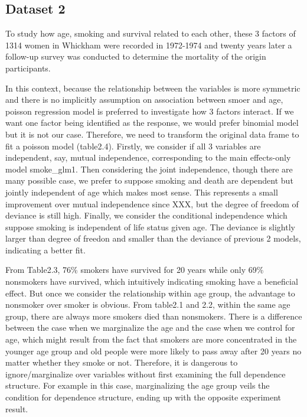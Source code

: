 \documentclass[]{article}
\begin{document}
\subsection{Dataset 2}\label{dataset-2}

To study how age, smoking and survival related to each other, these 3
factors of 1314 women in Whickham were recorded in 1972-1974 and twenty
years later a follow-up survey was conducted to determine the mortality
of the origin participants.

In this context, because the relationship between the variables is more
symmetric and there is no implicitly assumption on association between
smoer and age, poisson regression model is preferred to investigate how
3 factors interact. If we want one factor being identified as the
response, we would prefer binomial model but it is not our case.
Therefore, we need to transform the original data frame to fit a poisson
model (table2.4). Firstly, we consider if all 3 variables are
independent, say, mutual independence, corresponding to the main
effects-only model smoke\_glm1. Then considering the joint independence,
though there are many possible case, we prefer to suppose smoking and
death are dependent but jointly independent of age which makes most
sense. This represents a small improvement over mutual independence
since XXX, but the degree of freedom of deviance is still high. Finally,
we consider the conditional independence which suppose smoking is
independent of life status given age. The deviance is slightly larger
than degree of freedon and smaller than the deviance of previous 2
models, indicating a better fit.

From Table2.3, 76\% smokers have survived for 20 years while only 69\%
nonsmokers have survived, which intuitively indicating smoking have a
beneficial effect. But once we consider the relationship within age
group, the advantage to nonsmoker over smoker is obvious. From table2.1
and 2.2, within the same age group, there are always more smokers died
than nonsmokers. There is a difference between the case when we
marginalize the age and the case when we control for age, which might
result from the fact that smokers are more concentrated in the younger
age group and old people were more likely to pass away after 20 years no
matter whether they smoke or not. Therefore, it is dangerous to
ignore/marginalize over variables without first examining the full
dependence structure. For example in this case, marginalizing the age
group veils the condition for dependence structure, ending up with the
opposite experiment result.
\end{document}
